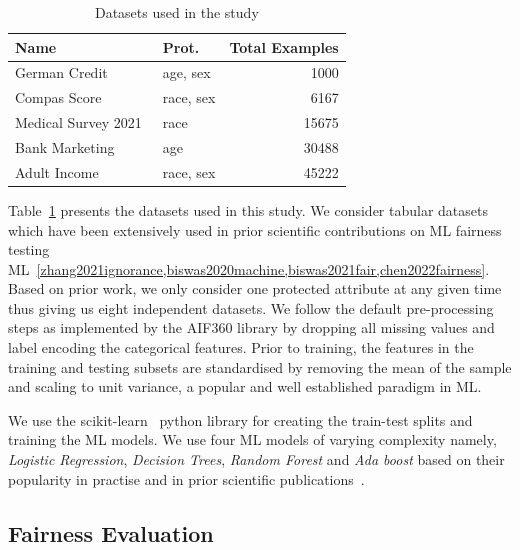 \documentclass{article}
\begin{document}
\begin{table}
  \centering
  \begin{tabular}{l l r}
    \toprule
    \textbf{Name} & \textbf{Prot.} & \textbf{Total Examples}\\
    \midrule
    German Credit \cite{hofmann1994german} & age, sex & 1000\\
    Compas Score \cite{angwin2016machine} & race, sex & 6167\\
    Medical Survey 2021 \cite{mepsdata} & race & 15675\\
    Bank Marketing \cite{moro2014data} & age & 30488\\
    Adult Income \cite{kohavi1996scaling} & race, sex & 45222\\
    \bottomrule
  \end{tabular}
  \label{tab:datasets}
  \caption{Datasets used in the study}
\end{table}

Table \ref{tab:datasets} presents the datasets used in this study. We
consider tabular datasets which have been extensively used in prior
scientific contributions on ML fairness testing
ML \ref{zhang2021ignorance,biswas2020machine,biswas2021fair,chen2022fairness}. Based
on prior work, we only consider one protected attribute at any given
time thus giving us eight independent datasets. We follow the default
pre-processing steps as implemented by the AIF360 library by dropping
all missing values and label encoding the categorical features. Prior
to training, the features in the training and testing subsets are
standardised by removing the mean of the sample and scaling to unit
variance, a popular and well established paradigm in ML.

We use the scikit-learn \cite{pedregosa2011scikit} python library for
creating the train-test splits and training the ML models. We use four
ML models of varying complexity namely, \emph{Logistic Regression},
\emph{Decision Trees}, \emph{Random Forest} and \emph{Ada boost} based
on their popularity in practise and in prior scientific
publications \cite{zhang2021ignorance,biswas2021fair,biswas2020machine}.

\subsection{Fairness Evaluation}\label{sec:method-fair-eval}
\end{document}
